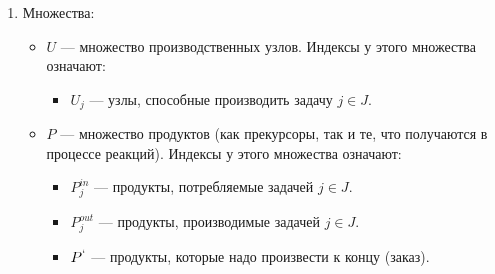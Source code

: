 \documentclass[12pt, twoside]{article}
\theoremstyle{definition}
\begin{document}
\begin{enumerate}
   \item Множества:
   \begin{itemize}
     \item $U$ --- множество производственных узлов. Индексы у этого множества означают:
     \begin{itemize}
     		\item $U_j$ --- узлы, способные производить задачу $j \in J$.
     \end{itemize}
     \item $P$ --- множество продуктов (как прекурсоры, так и те, что получаются в процессе реакций). Индексы у этого множества означают:
		\begin{itemize}
     		\item $P^{in}_j$ --- продукты, потребляемые задачей $j \in J$.
     		\item $P^{out}_j$ --- продукты, производимые задачей $j \in J$.
     		\item $P^{`}$ --- продукты, которые надо произвести к концу (заказ).
     \end{itemize}
     

\end{itemize}
\end{enumerate}
\end{document}
